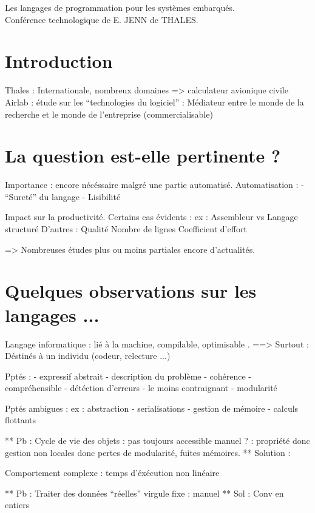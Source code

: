 \documentclass[a4paper,12pt]{article}
\begin{document}
\begin{center}
\Large{Les langages de programmation pour les systèmes embarqués.}\\
\vspace{0.4cm}
\normalsize{Conférence technologique de E. JENN de THALES.}\\
\end{center}

\section{Introduction}
Thales : Internationale, nombreux domaines
=> calculateur avionique civile
Airlab : étude sur les ``technologies du logiciel'' :
Médiateur entre le monde de la recherche et le monde de l'entreprise
(commercialisable)

\section{La question est-elle pertinente ?}
Importance : encore nécéssaire malgré une partie automatisé.
Automatisation :
 - ``Sureté'' du langage
 - Lisibilité

Impact sur la productivité.
Certains cas évidents :
  ex : Assembleur vs Langage structuré
D'autres :
  Qualité 
  Nombre de lignes
  Coefficient d'effort

=> Nombreuses études plus ou moins partiales encore d'actualités.
\section{Quelques observations sur les langages ...}
Langage informatique : lié à la machine, compilable, optimisable .
==> Surtout : Déstinés à un individu (codeur, relecture ...)

Pptés :
- expressif abstrait
- description du problème
- cohérence
- compréhensible
- détéction d'erreurs
- le moins contraignant
- modularité

Pptés ambigues :
ex : abstraction
- serialisations
- gestion de mémoire
- calculs flottants

** Pb : Cycle de vie des objets :
pas toujours accessible
manuel ? : propriété donc gestion non locales donc pertes de
modularité, fuites mémoires.
** Solution : 

Comportement complexe : temps d'éxécution non linéaire

** Pb : Traiter des données ``réelles''
virgule fixe : manuel
** Sol :
Conv en entiers
\end{document}
